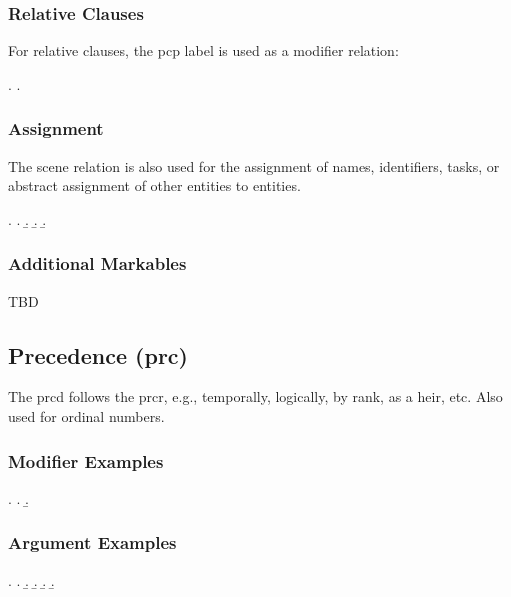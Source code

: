 \documentclass[a4paper]{article}
\begin{document}
\subsubsection{Relative Clauses}

For relative clauses, the \textsf{pcp} label is used as a modifier relation:

\ex. \a. 

\subsubsection{Assignment}

The scene relation is also used for the assignment of names, identifiers,
tasks, or abstract assignment of other entities to entities.

\ex.
\a. 
\b. 
\b. 
\b. 

\subsubsection{Additional Markables}

TBD


\clearpage
\subsection{Precedence (\textsf{prc})}
\label{sec:prc}

The \textsf{prcd} follows the \textsf{prcr}, e.g., temporally, logically, by
rank, as a heir, etc. Also used for ordinal numbers.

\subsubsection{Modifier Examples}

\ex.
\a. 
\b. 

\subsubsection{Argument Examples}

\ex.
\a. 
\b. 
\b. 
\b. 
\b. 
\end{document}
